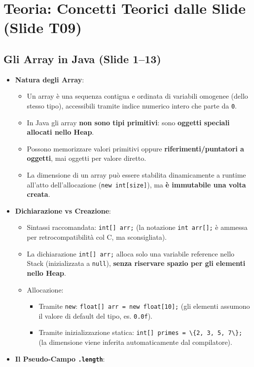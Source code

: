 \documentclass[11pt,a4paper,oneside]{report}
\newcommand{\passthrough}[1]{#1}
\providecommand{\tightlist}{\setlength{\itemsep}{0pt}\setlength{\parskip}{0pt}}
\begin{document}
\section{Teoria: Concetti Teorici dalle Slide (Slide
T09)}\label{chap08_teoria-concetti-teorici-dalle-slide-slide-t09}

\subsection{Gli Array in Java (Slide
1--13)}\label{chap08_gli-array-in-java-slide-113}

\begin{itemize}
\item
  \textbf{Natura degli Array}:

  \begin{itemize}
  \tightlist
  \item
    Un array è una sequenza contigua e ordinata di variabili omogenee
    (dello stesso tipo), accessibili tramite indice numerico intero che
    parte da \passthrough{\lstinline!0!}.
  \item
    In Java gli array \textbf{non sono tipi primitivi}: sono
    \textbf{oggetti speciali allocati nello Heap}.
  \item
    Possono memorizzare valori primitivi oppure
    \textbf{riferimenti/puntatori a oggetti}, mai oggetti per valore
    diretto.
  \item
    La dimensione di un array può essere stabilita dinamicamente a
    runtime all'atto dell'allocazione
    (\passthrough{\lstinline!new int[size]!}), ma \textbf{è immutabile
    una volta creata}.
  \end{itemize}
\item
  \textbf{Dichiarazione vs Creazione}:

  \begin{itemize}
  \tightlist
  \item
    Sintassi raccomandata: \passthrough{\lstinline!int[] arr;!} (la
    notazione \passthrough{\lstinline!int arr[];!} è ammessa per
    retrocompatibilità col C, ma sconsigliata).
  \item
    La dichiarazione \passthrough{\lstinline!int[] arr;!} alloca solo
    una variabile reference nello Stack (inizializzata a
    \passthrough{\lstinline!null!}), \textbf{senza riservare spazio per
    gli elementi nello Heap}.
  \item
    Allocazione:

    \begin{itemize}
    \tightlist
    \item
      Tramite \passthrough{\lstinline!new!}:
      \passthrough{\lstinline!float[] arr = new float[10];!} (gli
      elementi assumono il valore di default del tipo, es.
      \passthrough{\lstinline!0.0f!}).
    \item
      Tramite inizializzazione statica:
      \passthrough{\lstinline!int[] primes = \{2, 3, 5, 7\};!} (la
      dimensione viene inferita automaticamente dal compilatore).
    \end{itemize}
  \end{itemize}
\item
  \textbf{Il Pseudo-Campo \passthrough{\lstinline!.length!}}:


\end{itemize}
\end{document}
